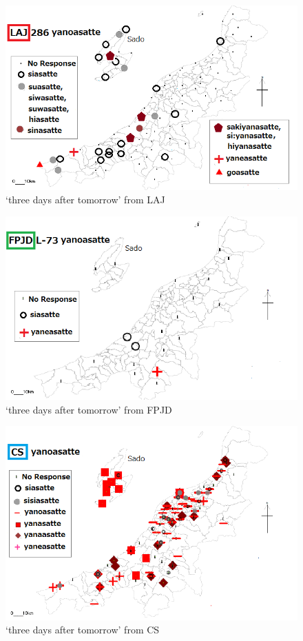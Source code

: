 \documentclass[output=paper]{LSP/langsci}
\begin{document}
\begin{figure}
\includegraphics[width=.75\textwidth]{illustrations/fuku2_fig6a}
\caption{`three days after tomorrow' from LAJ}
\label{fig:fuku:6a}
\end{figure}

\begin{figure}
\includegraphics[width=.75\textwidth]{illustrations/fuku2_fig6b}
\caption{`three days after tomorrow' from  FPJD}
\label{fig:fuku:6b}
\end{figure}

\begin{figure}
\includegraphics[width=.75\textwidth]{illustrations/fuku2_fig6c}
\caption{`three days after tomorrow' from CS}
\label{fig:fuku:6c}
\end{figure}
\end{document}
